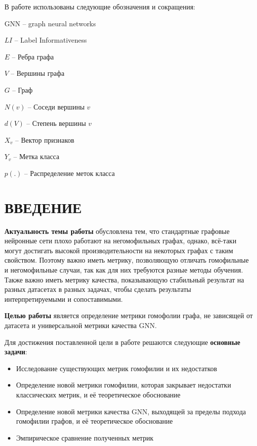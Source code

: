 \documentclass[a4paper,14pt]{article}
\begin{document}
	В работе  использованы следующие обозначения и сокращения:
	
	GNN	–	graph neural networks
	
	$LI$	–	Label Informativeness
	
	$E$	–	Ребра графа
	
	$V$	–	Вершины графа
	
	$G$	–	Граф
	
	$N(v)$	–	Соседи вершины $v$
	
	$d(V)$	–	Степень вершины $v$
	
	$X_v$	–	Вектор признаков
	
	$Y_v$	–	Метка класса 
	
	$p(.)$	–	Распределение меток класса
	
	\newpage
	
	\section*{ \hfill ВВЕДЕНИЕ \hfill}
	
	\textbf{Актуальность темы работы} обусловлена тем, что стандартные графовые нейронные сети плохо работают на негомофильных графах, однако, всё-таки могут достигать высокой производительности на некоторых графах с таким свойством.
	Поэтому важно иметь метрику, позволяющую отличать гомофильные и негомофильные случаи, так как для них требуются разные методы обучения.
	Также важно иметь метрику качества, показывающую стабильный результат на разных датасетах в разных задачах, чтобы сделать результаты интерпретируемыми и сопоставимыми. 
	
	\textbf{Целью работы} является определение метрики гомофолии графа, не зависящей от датасета и универсальной метрики качества GNN. 
	
	Для достижения поставленной цели в работе решаются следующие \textbf{основные задачи}:
	
	\begin{itemize}
		
	\item Исследование существующих метрик гомофилии и их недостатков
	
	\item Определение новой метрики гомофилии, которая закрывает недостатки классических метрик, и её теоретическое обоснование
	
	\item Определение новой метрики качества GNN, выходящей за пределы подхода гомофилии графов, и её теоретическое обоснование
	
	\item Эмпирическое сравнение полученных метрик
	
	\end{itemize}
	
\end{document}

